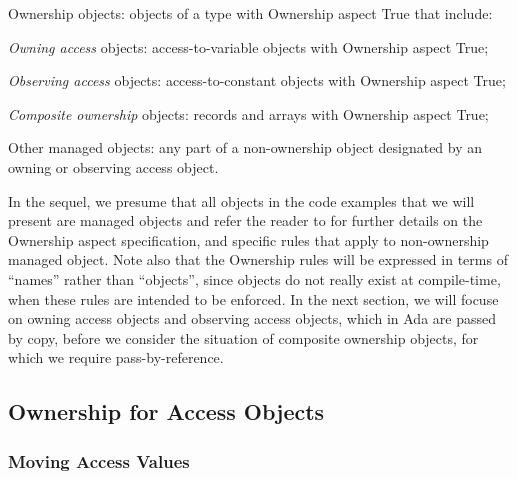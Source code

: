 \documentclass{llncs}
\begin{document}
\begin{compactitem}
\item Ownership objects: objects of a type with Ownership aspect True that include:
    \begin{compactitem}
\item \textit{Owning access} objects: access-to-variable objects with Ownership aspect True;
\item \textit{Observing access} objects: access-to-constant objects with Ownership aspect True;
\item \textit{Composite ownership} objects: records and arrays with Ownership aspect True;
    \end{compactitem}
\item Other managed objects: any part of a non-ownership object designated by an owning or observing access object.
\end{compactitem}
In the sequel, we presume that all objects in the code examples that we will present are managed objects and refer the reader to \cite{AI2017} for further details on
the Ownership aspect specification, and specific rules that apply to non-ownership managed object. Note also that the Ownership rules will be expressed in terms
of ``names'' rather than ``objects'', since objects do not really exist at compile-time, when these rules are intended to be enforced. 
In the next section, we will focuse on owning access objects and observing access objects, which in Ada are passed by copy, before we
consider the situation of composite ownership objects, for which we require pass-by-reference.


\subsection{Ownership for Access Objects}
\label{subsec:ownershipAccess}

\subsubsection{Moving Access Values}
\label{sec:moving}
\end{document}

